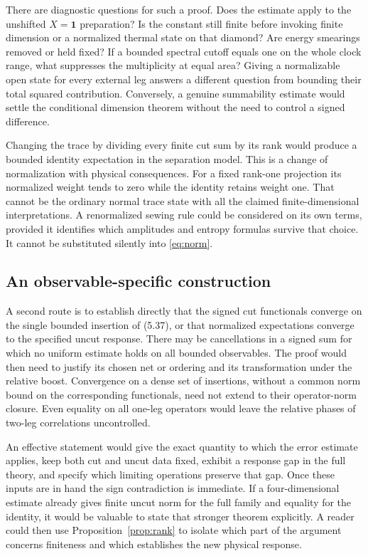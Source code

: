 \documentclass[11pt]{article}
\newcommand{\id}{\mathbf{1}}
\begin{document}
There are diagnostic questions for such a proof. Does the estimate apply to the unshifted $X=\id$ prep\-aration? Is the constant still finite before invoking finite dimension or a normalized thermal state on that diamond? Are energy smearings removed or held fixed? If a bounded spectral cutoff equals one on the whole clock range, what suppresses the multiplicity at equal area? Giving a normalizable open state for every external leg answers a different question from bounding their total squared contribution. Conversely, a genuine summability estimate would settle the conditional dimension theorem without the need to control a signed difference.

Changing the trace by dividing every finite cut sum by its rank would produce a bounded identity expectation in the separation model. This is a change of normalization with physical consequences. For a fixed rank-one projection its normalized weight tends to zero while the identity retains weight one. That cannot be the ordinary normal trace state with all the claimed finite-dimensional interpretations. A renormalized sewing rule could be considered on its own terms, provided it identifies which amplitudes and entropy formulas survive that choice. It cannot be substituted silently into \eqref{eq:norm}.

\subsection{An observable-specific construction}
A second route is to establish directly that the signed cut functionals converge on the single bounded insertion of (5.37), or that normalized expectations converge to the specified uncut response. There may be cancellations in a signed sum for which no uniform estimate holds on all bounded observables. The proof would then need to justify its chosen net or ordering and its transformation under the relative boost. Convergence on a dense set of insertions, without a common norm bound on the corresponding functionals, need not extend to their operator-norm closure. Even equality on all one-leg operators would leave the relative phases of two-leg correlations uncontrolled.

An effective statement would give the exact quantity to which the error estimate applies, keep both cut and uncut data fixed, exhibit a response gap in the full theory, and specify which limiting operations preserve that gap. Once these inputs are in hand the sign contradiction is immediate. If a four-dimensional estimate already gives finite uncut norm for the full family and equality for the identity, it would be valuable to state that stronger theorem explicitly. A reader could then use Proposition~\ref{prop:rank} to isolate which part of the argument concerns finiteness and which establishes the new physical response.
\end{document}
